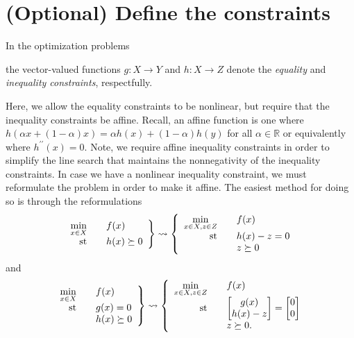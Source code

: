 \documentclass{report}
\newcommand{\re}{\mathbb{R}}
\newcommand{\st}{\textnormal{st}}
\newcommand{\secconstraints}{(Optional) Define the constraints}
\begin{document}
\section{\secconstraints}\label{sec:constraints}
        In the optimization problems
\begin{center}
    \usebox{\boxOptimizationTypes}
\end{center}
\noindent the vector-valued functions $g:X\rightarrow Y$ and $h:X\rightarrow Z$ denote the \textit{equality} and \textit{inequality constraints}, respectfully.

        Here, we allow the equality constraints to be nonlinear, but require that the inequality constraints be affine.  Recall, an affine function is one where $h(\alpha x+(1-\alpha)x)=\alpha h(x)+(1-\alpha)h(y)$ for all $\alpha\in\re$ or equivalently where $h^{\prime\prime}(x)=0$.  Note, we require affine inequality constraints in order to simplify the line search that maintains the nonnegativity of the inequality constraints.  In case we have a nonlinear inequality constraint, we must reformulate the problem in order to make it affine.  The easiest method for doing so is through the reformulations 
$$\left.\begin{array}{rcl}
        \min\limits_{x\in X} && f(x)\\
        \st && h(x)\succeq 0
\end{array}\right\}
\leadsto
\left\{\begin{array}{rcl}
        \min\limits_{x\in X,z\in Z} && f(x)\\
        \st && h(x)-z=0\\
            && z\succeq 0
\end{array}\right.$$
and
$$\left.\begin{array}{rcl}
        \min\limits_{x\in X} && f(x)\\
        \st && g(x)=0\\
            && h(x)\succeq 0
\end{array}\right\}
\leadsto
\left\{\begin{array}{rcl}
        \min\limits_{x\in X,z\in Z} && f(x)\\
        \st && \begin{bmatrix}g(x)\\h(x)-z\end{bmatrix}=\begin{bmatrix}0\\0\end{bmatrix}\\
            && z\succeq 0.
\end{array}\right.$$
\end{document}
